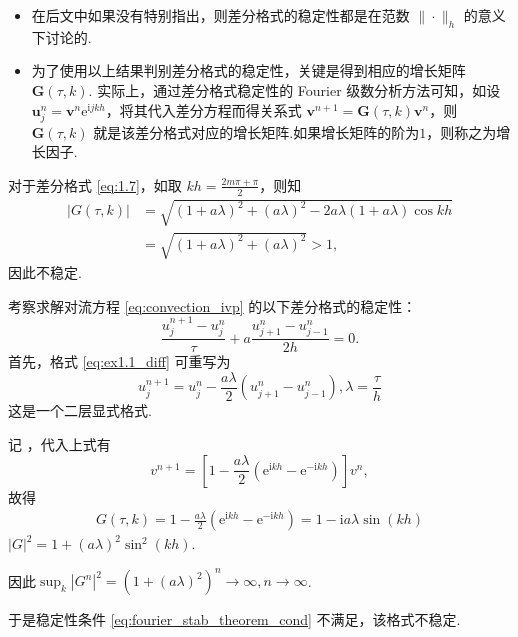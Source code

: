 \begin{itemize}
    \item 在后文中如果没有特别指出，则差分格式的稳定性都是在范数 $\|\cdot\|_h$ 的意义下讨论的.
    \item 为了使用以上结果判别差分格式的稳定性，关键是得到相应的增长矩阵 $\bm{G}(\tau, k)$.
    实际上，通过差分格式稳定性的 Fourier 级数分析方法可知，如设 $\bm{u}_j^n = \bm{v}^n \mathrm{e}^{\mathrm{i} j k h}$，将其代入差分方程而得关系式 $\bm{v}^{n+1} = \bm{G}(\tau, k)\bm{v}^n$，则 $\bm{G}(\tau, k)$ 就是该差分格式对应的增长矩阵.如果增长矩阵的阶为$1$，则称之为增长因子.
\end{itemize}

对于差分格式 \eqref{eq:1.7}，如取 $kh = \frac{2m\pi+\pi}{2}$，则知
\begin{align*}
    |G(\tau,k)| &= \sqrt{(1+a\lambda)^2 + (a\lambda)^2 - 2a\lambda(1+a\lambda)\cos kh} \\
    &= \sqrt{(1+a\lambda)^2 + (a\lambda)^2} > 1,
\end{align*}
因此不稳定.

\begin{instance}
    考察求解对流方程 \eqref{eq:convection_ivp} 的以下差分格式的稳定性：
    \begin{equation}
        \frac{u_j^{n+1} - u_j^n}{\tau} + a \frac{u_{j+1}^n - u_{j-1}^n}{2h} = 0. \label{eq:ex1.1_diff}
    \end{equation}
    \noindent{}
    首先，格式 \eqref{eq:ex1.1_diff} 可重写为
    \[ u_j^{n+1} = u_j^n - \frac{a\lambda}{2}(u_{j+1}^n - u_{j-1}^n),\lambda=\frac{\tau}{h}\]
    这是一个二层显式格式.\par
    \noindent{}
    记 ，代入上式有
    \[ v^{n+1} = \left[ 1 - \frac{a\lambda}{2} \left( \mathrm{e}^{\mathrm{i} k h} - \mathrm{e}^{-\mathrm{i} k h} \right) \right] v^n, \]
    故得
    \begin{align*}
        G(\tau,k) = 1 - \frac{a\lambda}{2} \left( \mathrm{e}^{\mathrm{i} k h} - \mathrm{e}^{-\mathrm{i} k h} \right) = 1 - \mathrm{i} a\lambda \sin(kh)
    \end{align*}
    \noindent{}\;$|G|^2=1+(a\lambda)^2\sin^2 (kh)$.\par
    因此$\sup_k|G^n|^2=\left(1+(a\lambda)^2\right)^n\to \infty,n\to\infty$.\par
    于是稳定性条件 \eqref{eq:fourier_stab_theorem_cond} 不满足，该格式不稳定.
\end{instance}

